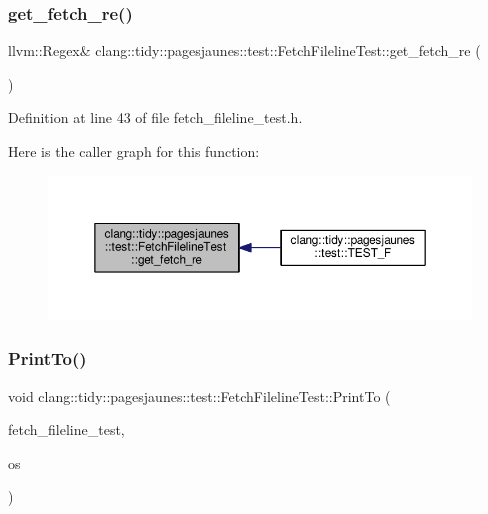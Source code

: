 \subsubsection{\texorpdfstring{get\+\_\+fetch\+\_\+re()}{get\_fetch\_re()}}
{\footnotesize\ttfamily llvm\+::\+Regex\& clang\+::tidy\+::pagesjaunes\+::test\+::\+Fetch\+Fileline\+Test\+::get\+\_\+fetch\+\_\+re (\begin{DoxyParamCaption}{ }\end{DoxyParamCaption})\hspace{0.3cm}{\ttfamily [inline]}}



Definition at line 43 of file fetch\+\_\+fileline\+\_\+test.\+h.

Here is the caller graph for this function\+:
\nopagebreak
\begin{figure}[H]
\begin{center}
\leavevmode
\includegraphics[width=350pt]{classclang_1_1tidy_1_1pagesjaunes_1_1test_1_1_fetch_fileline_test_ab098b84f30e24c2158941c40a8b41a19_icgraph}
\end{center}
\end{figure}
\mbox{\label{classclang_1_1tidy_1_1pagesjaunes_1_1test_1_1_fetch_fileline_test_acc3b4dfdaeb13ef85054d29057d7f3e7}} 
\subsubsection{\texorpdfstring{Print\+To()}{PrintTo()}}
{\footnotesize\ttfamily void clang\+::tidy\+::pagesjaunes\+::test\+::\+Fetch\+Fileline\+Test\+::\+Print\+To (\begin{DoxyParamCaption}\item[{const \hyperlink{classclang_1_1tidy_1_1pagesjaunes_1_1test_1_1_fetch_fileline_test}{Fetch\+Fileline\+Test} \&}]{fetch\+\_\+fileline\+\_\+test,  }\item[{\+::std\+::ostream $\ast$}]{os }\end{DoxyParamCaption})}



